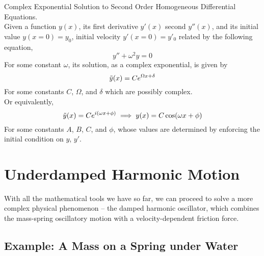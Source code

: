 \documentclass[11pt]{article}
\theoremstyle{gangnamstyle}{\newtheorem{definition}{Definition}[]}
\theoremstyle{gangnamstyle}{\newtheorem{example}{Example}[]}
\theoremstyle{gangnamstyle}{\newtheorem{problem}{Problem}[]}
\theoremstyle{gangnamstyle}{\newtheorem{warning}{Warning}[]}
\begin{document}
\begin{definition}
Complex Exponential Solution to Second Order Homogeneous Differential Equations. \\
Given a function $y(x)$, its first derivative $y'(x)$ second $y''(x)$, and its initial value $y(x = 0) = y_0$, initial velocity $y'(x = 0) = y'_0$ related by the following equation, 
\begin{equation}
y'' + \omega^2y = 0
\end{equation}
For some constant $\omega$, its solution, as a complex exponential, is given by
\begin{equation}
\Tilde{y}(x) = Ce^{\Omega x + \delta}
\end{equation}
For some constants $C$, $\Omega$, and $\delta$ which are possibly complex. \\
Or equivalently, 
\begin{equation}
\Tilde{y}(x) = Ce^{i(\omega x + \phi)} \implies y(x) = C\cos(\omega x + \phi)
\end{equation}
For some constants $A$, $B$, $C$, and $\phi$, whose values are determined by enforcing the initial condition on $y$, $y'$. 
\end{definition}
\pagebreak

\section{Underdamped Harmonic Motion}
With all the mathematical tools we have so far, we can proceed to solve a more complex physical phenomenon -- the damped harmonic oscillator, which combines the mass-spring oscillatory motion with a velocity-dependent friction force. 

\subsection{Example: A Mass on a Spring under Water}
\end{document}
